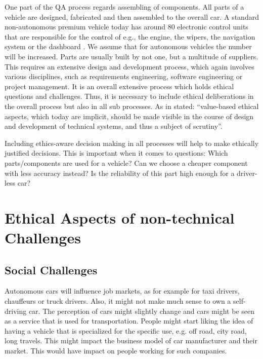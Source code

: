 One part of the QA process regards assembling of components. All parts of a vehicle are designed, fabricated and then assembled to the overall car. A standard non-autonomous premium vehicle today has around 80 electronic control units that are responsible for the control of e.g., the engine, the wipers, the navigation system or the dashboard \cite{BoschGmbH2013}. We assume that for autonomous vehicles the number will be increased. Parts are usually built by not one, but a multitude of suppliers. This requires an extensive design and development process, which again involves various disciplines, such as requirements engineering, software engineering or project management. It is an overall extensive process which holds ethical questions and challenges. Thus, it is necessary to include ethical deliberations in the overall process but also in all sub processes. As in \cite{Sapienza2016a} stated: \enquote{value-based ethical aspects, which today are implicit, should be made visible in the course of design and development of technical systems, and thus a subject of scrutiny}. 

Including ethics-aware decision making in all processes will help to make ethically justified decisions. This is important when it comes to questions: Which parts/components are used for a vehicle? Can we choose a cheaper component with less accuracy instead? Is the reliability of this part high enough for a driver-less car?



\section{Ethical Aspects of non-technical Challenges}
\label{sec:EAofNONTC}

\subsection{Social Challenges}
\label{sec:EAofNONTC:SocialChallenges}

Autonomous cars will influence job markets, as for example for taxi drivers, chauffeurs or truck drivers. Also, it might not make much sense to own a self-driving car. The perception of cars might slightly change and cars might be seen as a service that is used for transportation. People might start liking the idea of having a vehicle that is specialized for the specific use, e.g. off road, city road, long travels. This might impact the business model of car manufacturer and their market. This would have impact on people working for such companies.

